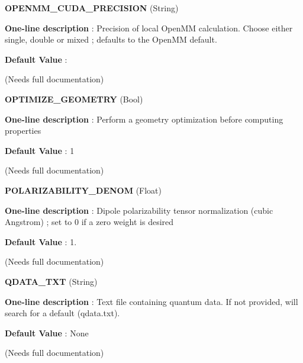 \begin{DoxyItemize}
\item {\bfseries  O\-P\-E\-N\-M\-M\-\_\-\-C\-U\-D\-A\-\_\-\-P\-R\-E\-C\-I\-S\-I\-O\-N } (String) \par
{\bfseries  One-\/line description }\-: Precision of local Open\-M\-M calculation. Choose either single, double or mixed ; defaults to the Open\-M\-M default. \par
{\bfseries  Default Value }\-: \par
(Needs full documentation)\end{DoxyItemize}
\begin{DoxyItemize}
\item {\bfseries  O\-P\-T\-I\-M\-I\-Z\-E\-\_\-\-G\-E\-O\-M\-E\-T\-R\-Y } (Bool) \par
{\bfseries  One-\/line description }\-: Perform a geometry optimization before computing properties \par
{\bfseries  Default Value }\-: 1 \par
(Needs full documentation)\end{DoxyItemize}
\begin{DoxyItemize}
\item {\bfseries  P\-O\-L\-A\-R\-I\-Z\-A\-B\-I\-L\-I\-T\-Y\-\_\-\-D\-E\-N\-O\-M } (Float) \par
{\bfseries  One-\/line description }\-: Dipole polarizability tensor normalization (cubic Angstrom) ; set to 0 if a zero weight is desired \par
{\bfseries  Default Value }\-: 1. \par
(Needs full documentation)\end{DoxyItemize}
\begin{DoxyItemize}
\item {\bfseries  Q\-D\-A\-T\-A\-\_\-\-T\-X\-T } (String) \par
{\bfseries  One-\/line description }\-: Text file containing quantum data. If not provided, will search for a default (qdata.\-txt). \par
{\bfseries  Default Value }\-: None \par
(Needs full documentation)\end{DoxyItemize}
